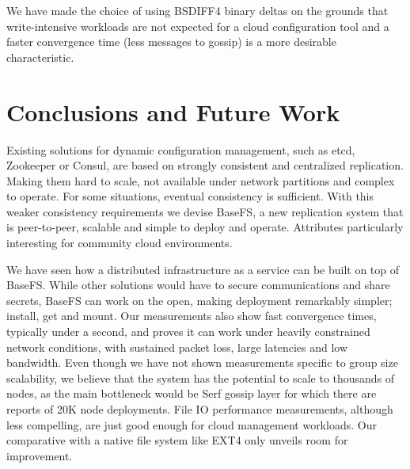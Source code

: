 \documentclass{sig-alternate}
\begin{document}
We have made the choice of using BSDIFF4 binary deltas on the grounds that write-intensive workloads are not expected for a cloud configuration tool and a faster convergence time (less messages to gossip) is a more desirable characteristic.


\section{Conclusions and Future Work}

Existing solutions for dynamic configuration management, such as etcd, Zookeeper or Consul, are based on strongly consistent and centralized replication. Making them hard to scale, not available under network partitions and complex to operate. For some situations, eventual consistency is sufficient. With this weaker consistency requirements we devise BaseFS, a new replication system that is peer-to-peer, scalable and simple to deploy and operate. Attributes particularly interesting for community cloud environments.

We have seen how a distributed infrastructure as a service can be built on top of BaseFS. While other solutions would have to secure communications and share secrets, BaseFS can work on the open, making deployment remarkably simpler; install, get and mount. Our measurements also show fast convergence times, typically under a second, and proves it can work under heavily constrained network conditions, with sustained packet loss, large latencies and low bandwidth. Even though we have not shown measurements specific to group size scalability, we believe that the system has the potential to scale to thousands of nodes, as the main bottleneck would be Serf gossip layer for which there are reports of 20K node deployments. File IO performance measurements, although less compelling, are just good enough for cloud management workloads. Our comparative with a native file system like EXT4 only unveils room for improvement.
\end{document}
